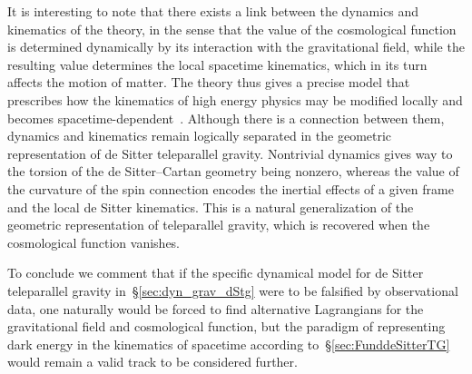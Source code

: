 \documentclass[
final,
11pt,
a4paper,
DIV=11,
headinclude=true,
footinclude=false,
bibliography=totoc,
twoside=true,  %
BCOR=5mm
]{scrbook}
\begin{document}
It is interesting to note that there exists a link between the 
dynamics and kinematics of the theory, in the sense that the 
value of the cosmological function is determined dynamically by 
its interaction with the gravitational field, while the resulting 
value determines the local spacetime kinematics, which in its 
turn affects the motion of matter. The theory thus gives 
a precise model that prescribes how the kinematics of high energy 
physics may be modified locally and becomes 
spacetime-dependent~\cite{Mansouri:2002cg}. Although there is 
a connection between them, dynamics and kinematics remain 
logically separated in the geometric representation of de Sitter 
teleparallel gravity. Nontrivial dynamics gives way to the 
torsion of the de Sitter--Cartan geometry being nonzero, whereas 
the value of the curvature of the spin connection encodes the 
inertial effects of a given frame and the local de Sitter 
kinematics. This is a natural generalization of the geometric 
representation of teleparallel gravity, which is recovered when 
the cosmological function vanishes.

To conclude we comment that if the specific dynamical model for 
de Sitter teleparallel gravity in~\S\ref{sec:dyn_grav_dStg} were 
to be falsified by observational data, one naturally would be 
forced to find alternative Lagrangians for the gravitational 
field and cosmological function, but the paradigm of representing 
dark energy in the kinematics of spacetime according 
to~\S\ref{sec:FunddeSitterTG} would remain a valid track to be 
considered further.
\end{document}
